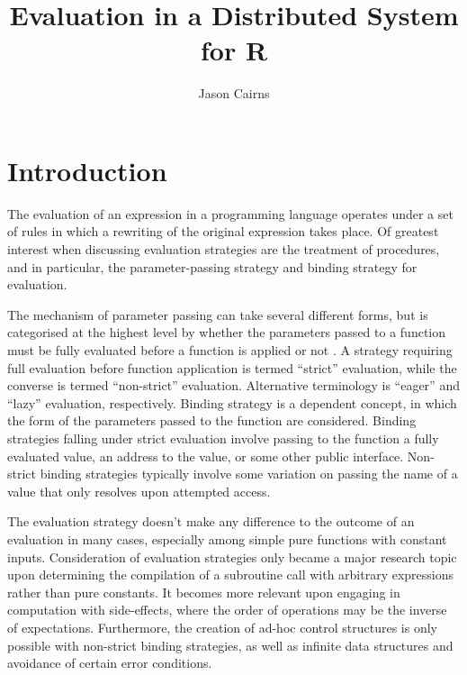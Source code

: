 \documentclass[10pt,a4paper]{article}
\begin{document}
    \title{Evaluation in a Distributed System for R}
    \author{Jason Cairns}
      
    \maketitle

\section{Introduction}

The evaluation of an expression in a programming language operates under a set of rules in which a rewriting of the original expression takes place.
Of greatest interest when discussing evaluation strategies are the treatment of procedures, and in particular, the parameter-passing strategy and binding strategy for evaluation.

The mechanism of parameter passing can take several different forms, but is categorised at the highest level by whether the parameters passed to a function must be fully evaluated before a function is applied or not \cite{crank1991param}.
A strategy requiring full evaluation before function application is termed ``strict'' evaluation, while the converse is termed ``non-strict'' evaluation.
Alternative terminology is ``eager'' and ``lazy'' evaluation, respectively\cite{henderson1976lazy}.
Binding strategy is a dependent concept, in which the form of the parameters passed to the function are considered\cite{abelson1996sicp:order}.
Binding strategies falling under strict evaluation involve passing to the function a fully evaluated value, an address to the value, or some other public interface.
Non-strict binding strategies typically involve some variation on passing the name of a value that only resolves upon attempted access.

The evaluation strategy doesn't make any difference to the outcome of an evaluation in many cases, especially among simple pure functions with constant inputs.
Consideration of evaluation strategies only became a major research topic upon determining the compilation of a subroutine call with arbitrary expressions rather than pure constants.
It becomes more relevant upon engaging in computation with side-effects, where the order of operations may be the inverse of expectations.
Furthermore, the creation of ad-hoc control structures is only possible with non-strict binding strategies, as well as infinite data structures and avoidance of certain error conditions\cite{okasaki1998functional}.
\end{document}
